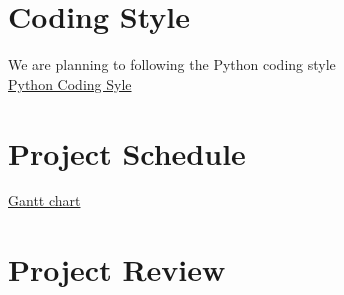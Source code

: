 \documentclass{article}
\begin{document}
\section{Coding Style}
We are planning to following the Python coding style\\
\href{https://google.github.io/styleguide/pyguide.html}{Python Coding Syle}

\section{Project Schedule}
\href{run:../../ProjectSchedule/Gantt-FinalSubmission.pdf}{Gantt chart}

\section{Project Review}
\end{document}
